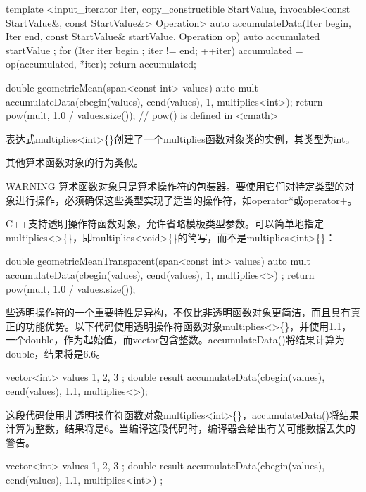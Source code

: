 \begin{cpp}
template <input_iterator Iter, copy_constructible StartValue,
          invocable<const StartValue&, const StartValue&> Operation>
auto accumulateData(Iter begin, Iter end,
    const StartValue& startValue, Operation op)
{
    auto accumulated { startValue };
    for (Iter iter { begin }; iter != end; ++iter) {
        accumulated = op(accumulated, *iter);
    }
    return accumulated;
}

double geometricMean(span<const int> values)
{
    auto mult {accumulateData(cbegin(values), cend(values), 1, multiplies<int>{})};
    return pow(mult, 1.0 / values.size()); // pow() is defined in <cmath>
}
\end{cpp}

表达式multiplies<int>\{\}创建了一个multiplies函数对象类的实例，其类型为int。

其他算术函数对象的行为类似。

\begin{myWarning}{WARNING}
算术函数对象只是算术操作符的包装器。要使用它们对特定类型的对象进行操作，必须确保这些类型实现了适当的操作符，如operator*或operator+。
\end{myWarning}


C++支持透明操作符函数对象，允许省略模板类型参数。可以简单地指定multiplies<>\{\}，即multiplies<void>\{\}的简写，而不是multiplies<int>\{\}：

\begin{cpp}
double geometricMeanTransparent(span<const int> values)
{
    auto mult { accumulateData(cbegin(values), cend(values), 1, multiplies<>{}) };
    return pow(mult, 1.0 / values.size());
}
\end{cpp}

些透明操作符的一个重要特性是异构，不仅比非透明函数对象更简洁，而且具有真正的功能优势。以下代码使用透明操作符函数对象multiplies<>\{\}，并使用1.1，一个double，作为起始值，而vector包含整数。accumulateData()将结果计算为double，结果将是6.6。

\begin{cpp}
vector<int> values { 1, 2, 3 };
double result {accumulateData(cbegin(values), cend(values), 1.1, multiplies<>{})};
\end{cpp}

这段代码使用非透明操作符函数对象multiplies<int>\{\}，accumulateData()将结果计算为整数，结果将是6。当编译这段代码时，编译器会给出有关可能数据丢失的警告。

\begin{cpp}
vector<int> values { 1, 2, 3 };
double result {
    accumulateData(cbegin(values), cend(values), 1.1, multiplies<int>{}) };
\end{cpp}


